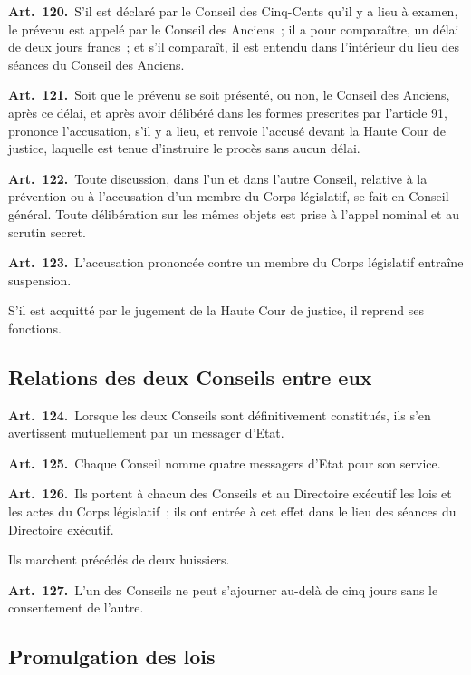 \documentclass[french,twoside]{book} %
\newcommand{\labelchar}[1]{\textbf{\color{rubric} #1}}
\begin{document}
\labelchar{Art. 120.} S’il est déclaré par le Conseil des Cinq-Cents qu’il y a lieu à examen, le prévenu est appelé par le Conseil des Anciens ; il a pour comparaître, un délai de deux jours francs ; et s’il comparaît, il est entendu dans l’intérieur du lieu des séances du Conseil des Anciens.\par
\labelchar{Art. 121.} Soit que le prévenu se soit présenté, ou non, le Conseil des Anciens, après ce délai, et après avoir délibéré dans les formes prescrites par l’article 91, prononce l’accusation, s’il y a lieu, et renvoie l’accusé devant la Haute Cour de justice, laquelle est tenue d’instruire le procès sans aucun délai.\par
\labelchar{Art. 122.} Toute discussion, dans l’un et dans l’autre Conseil, relative à la prévention ou à l’accusation d’un membre du Corps législatif, se fait en Conseil général. Toute délibération sur les mêmes objets est prise à l’appel nominal et au scrutin secret.\par
\labelchar{Art. 123.} L’accusation prononcée contre un membre du Corps législatif entraîne suspension.\par
S’il est acquitté par le jugement de la Haute Cour de justice, il reprend ses fonctions.

\subsection[{Relations des deux Conseils entre eux}]{Relations des deux Conseils entre eux}

\labelchar{Art. 124.} Lorsque les deux Conseils sont définitivement constitués, ils s’en avertissent mutuellement par un messager d’Etat.\par
\labelchar{Art. 125.} Chaque Conseil nomme quatre messagers d’Etat pour son service.\par
\labelchar{Art. 126.} Ils portent à chacun des Conseils et au Directoire exécutif les lois et les actes du Corps législatif ; ils ont entrée à cet effet dans le lieu des séances du Directoire exécutif.\par
Ils marchent précédés de deux huissiers.\par
\labelchar{Art. 127.} L’un des Conseils ne peut s’ajourner au-delà de cinq jours sans le consentement de l’autre.

\subsection[{Promulgation des lois}]{Promulgation des lois}
\end{document}
